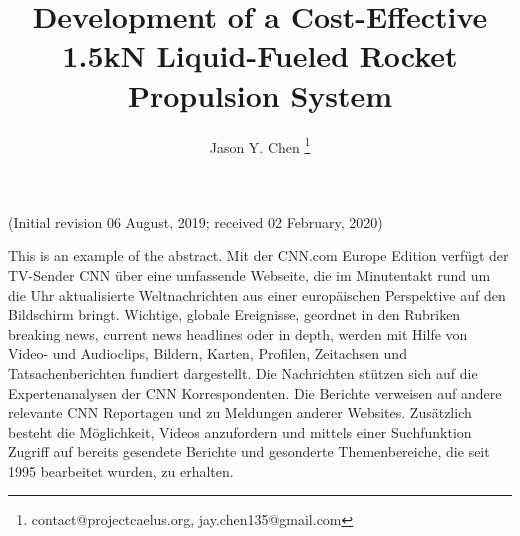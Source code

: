 \documentclass[9pt]{article} %
\title{Development of a Cost-Effective 1.5kN Liquid-Fueled Rocket Propulsion System}
\author[1]{Jason Y. Chen \footnote{contact@projectcaelus.org,  jay.chen135@gmail.com}}
\affil[1]{Founder, Project Caelus 501(c)(3)}
\date{} %
\numberwithin{equation}{section} %
\begin{document}
\maketitle
\vspace{-1cm}
\begin{center}
(Initial revision 06 August, 2019; received 02 February, 2020)
\end{center}

\begin{adjustwidth}{40pt}{40pt}
\hspace{\parindent} This is an example of the abstract. Mit der CNN.com Europe Edition verfügt der TV-Sender CNN über eine umfassende Webseite, die im Minutentakt rund um die Uhr aktualisierte Weltnachrichten aus einer europäischen Perspektive auf den Bildschirm bringt. Wichtige, globale Ereignisse, geordnet in den Rubriken breaking news, current news headlines oder in depth, werden mit Hilfe von Video- und Audioclips, Bildern, Karten, Profilen, Zeitachsen und Tatsachenberichten fundiert dargestellt. Die Nachrichten stützen sich auf die Expertenanalysen der CNN Korrespondenten. Die Berichte verweisen auf andere relevante CNN Reportagen und zu Meldungen anderer Websites. Zusätzlich besteht die Möglichkeit, Videos anzufordern und mittels einer Suchfunktion Zugriff auf bereits gesendete Berichte und gesonderte Themenbereiche, die seit 1995 bearbeitet wurden, zu erhalten.

\end{adjustwidth}
\vspace{0.5cm}
\end{document}

